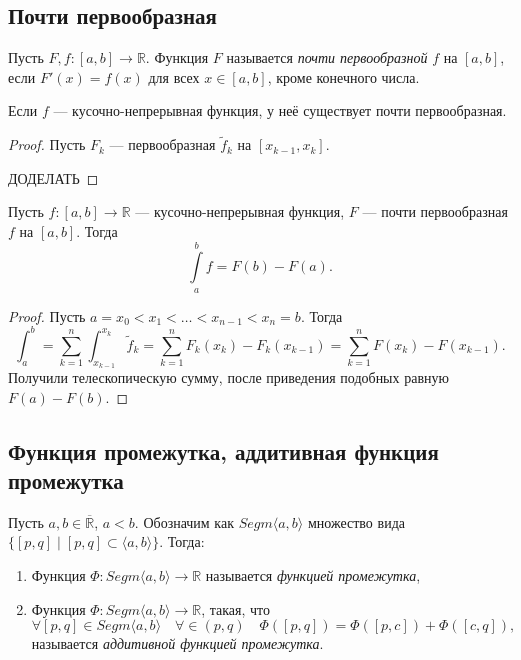 \subsection{Почти первообразная}

\begin{definition}
	Пусть \(F, f \colon [a, b] \to \mathbb{R}\). Функция \(F\) называется \textit{почти первообразной} \(f\) на \([a, b]\), если \(F'(x) = f(x)\) для всех \(x \in [a, b]\), кроме конечного числа.
\end{definition}

\begin{nremark}
	Если \(f\) --- кусочно-непрерывная функция, у неё существует почти первообразная.
\end{nremark}
\begin{proof}
	Пусть \(F_k\) --- первообразная \(\widetilde{f}_k\) на \([x_{k - 1}, x_k]\).
	
	ДОДЕЛАТЬ
\end{proof}

\begin{nremark}
	Пусть \(f \colon [a, b] \to \mathbb{R}\) --- кусочно-непрерывная функция, \(F\) --- почти первообразная \(f\) на \([a, b]\). Тогда \[
		\int\limits_a^b f = F(b) - F(a).
	\]
\end{nremark}
\begin{proof}
	Пусть \(a = x_0 < x_1 < \ldots < x_{n - 1} < x_n = b\). Тогда \[
		\int_a^b = \sum_{k = 1}^n \int_{x_{k - 1}}^{x_k} \widetilde{f}_k = \sum_{k = 1}^n F_k(x_k) - F_k (x_{k - 1}) = \sum_{k = 1}^n F(x_k) - F(x_{k - 1}).
	\]
	Получили телескопическую сумму, после приведения подобных равную \(F(a) - F(b)\).
\end{proof}

\subsection{Функция промежутка, аддитивная функция промежутка}

\begin{definition}
	Пусть \(a, b \in \overline{\mathbb{R}}\), \(a < b\). Обозначим как \(Segm \langle a, b \rangle\) множество вида \(\{[p, q] \mid [p, q] \subset \langle a, b \rangle\}\). Тогда:
	\begin{enumerate}
		\item Функция \(\Phi \colon Segm \langle a, b \rangle \to \mathbb{R}\) называется \textit{функцией промежутка},
		\item Функция \(\Phi \colon Segm \langle a, b \rangle \to \mathbb{R}\), такая, что \[
			\forall [p, q] \in Segm \langle a, b \rangle \quad \forall \in (p, q) \quad \Phi([p, q]) = \Phi([p, c]) + \Phi([c, q]),
		\]
		называется \textit{аддитивной функцией промежутка}.
	\end{enumerate}
\end{definition}

